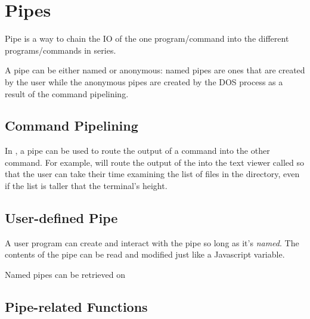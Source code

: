 \chapter{Pipes}

Pipe is a way to chain the IO of the one program/command into the different programs/commands in series.

A pipe can be either named or anonymous: named pipes are ones that are created by the user while the anonymous pipes are created by the DOS process as a result of the command pipelining.

\section{Command Pipelining}

In \thedos, a pipe can be used to route the output of a command into the other command. For example,  will route the output of the  into the text viewer called  so that the user can take their time examining the list of files in the directory, even if the list is taller that the terminal's height.

\section{User-defined Pipe}

A user program can create and interact with the pipe so long as it's \emph{named}. The contents of the pipe can be read and modified just like a Javascript variable.

Named pipes can be retrieved on 

\section{Pipe-related Functions}

\begin{outline}
\1
\1
\1
\1
\1
\1
\end{outline}


